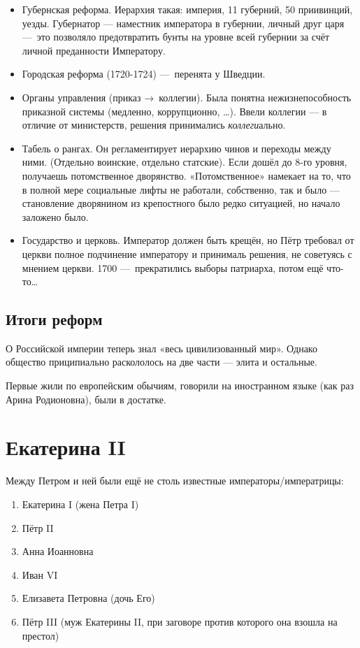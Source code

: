 \documentclass[12pt, a4paper]{article}
\begin{document}
\begin{itemize}
    \item Губернская реформа. Иерархия такая: империя, 11 губерний, 50 приивинций, уезды. 
    Губернатор — наместник императора в губернии, личный друг царя — это позволяло предотвратить бунты на уровне всей губернии за счёт личной преданности Императору. 

    \item Городская реформа (1720-1724) — перенята у Шведции.
    \item Органы управления (приказ → коллегии). Была понятна нежизнепособность приказной системы (медленно, коррупционно, …). 
    Ввели коллегии — в отличие от министерств, решения принимались \textit{коллеги}ально.

    \item Табель о рангах. Он регламентирует иерархию чинов и переходы между ними. (Отдельно воинские, отдельно статские). 
    Если дошёл до 8-го уровня, получаешь потомственное дворянство. 
    «Потомственное» намекает на то, что в полной мере социальные лифты не работали, собственно, 
    так и было — становление дворянином из крепостного было редко ситуацией, но начало заложено было.
    
    \item Государство и церковь. Император должен быть крещён, но Пётр требовал от церкви полное подчинение императору и принималь решения, не советуясь с мнением церкви.
    1700 — прекратились выборы патриарха, потом ещё что-то…
\end{itemize}

\subsection{Итоги реформ}

О Российской империи теперь знал «весь цивилизованный мир». 
Однако общество приципиально раскололось на две части — элита и остальные.

Первые жили по европейским обычиям, говорили на иностранном языке (как раз Арина Родионовна), были в достатке. 



\section{Екатерина II}


Между Петром и ней были ещё не столь известные императоры/императрицы: 
\begin{enumerate}
    \item Екатерина I (жена Петра I)
    \item Пётр II
    \item Анна Иоанновна
    \item Иван VI
    \item Елизавета Петровна (дочь Его)
    \item Пётр III (муж Екатерины II, при заговоре против которого она взошла на престол)
\end{enumerate} 
\end{document}
